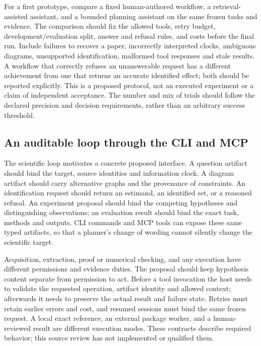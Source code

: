 For a first prototype, compare a fixed human-authored workflow, a retrieval-assisted
assistant, and a bounded planning assistant on the same frozen tasks and evidence.
The comparison should fix the allowed tools, retry budget, development/evaluation
split, answer and refusal rules, and costs before the final run. Include failures
to recover a paper, incorrectly interpreted clocks, ambiguous diagrams, unsupported
identification, malformed tool responses and stale results. A workflow that
correctly refuses an unanswerable request has a different achievement from one
that returns an accurate identified effect; both should be reported explicitly.
This is a proposed protocol, not an executed experiment or a claim of independent
acceptance. The number and mix of trials should follow the declared precision
and decision requirements, rather than an arbitrary success threshold.

\subsection{An auditable loop through the CLI and MCP}

The scientific loop motivates a concrete proposed interface. A question artifact
should bind the target, source identities and information clock. A diagram artifact
should carry alternative graphs and the provenance of constraints. An identification
request should return an estimand, an identified set, or a reasoned refusal. An
experiment proposal should bind the competing hypotheses and distinguishing
observations; an evaluation result should bind the exact task, methods and outputs.
CLI commands and MCP tools can expose these same typed artifacts, so that a
planner's change of wording cannot silently change the scientific target.

Acquisition, extraction, proof or numerical checking, and any execution have
different permissions and evidence duties. The proposal should keep hypothesis
content separate from permission to act. Before a tool invocation the host needs
to validate the requested operation, artifact identity and allowed context;
afterwards it needs to preserve the actual result and failure state. Retries
must retain earlier errors and cost, and resumed sessions must bind the same
frozen request. A local exact reference, an external package worker, and a
human-reviewed result are different execution modes. These contracts describe
required behavior; this source review has not implemented or qualified them.


